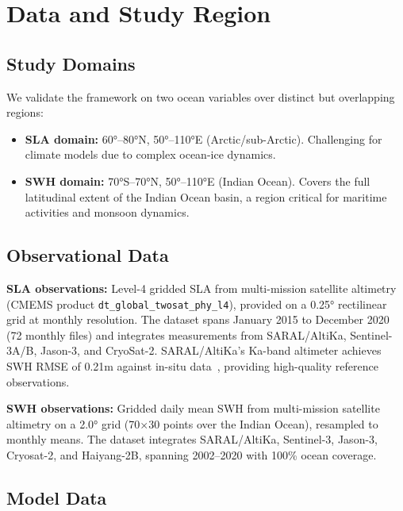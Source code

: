 \documentclass[conference]{IEEEtran}
\begin{document}
\section{Data and Study Region}

\subsection{Study Domains}

We validate the framework on two ocean variables over distinct but overlapping regions:
\begin{itemize}
    \item \textbf{SLA domain:} 60°--80°N, 50°--110°E (Arctic/sub-Arctic). Challenging for climate models due to complex ocean-ice dynamics.
    \item \textbf{SWH domain:} 70°S--70°N, 50°--110°E (Indian Ocean). Covers the full latitudinal extent of the Indian Ocean basin, a region critical for maritime activities and monsoon dynamics.
\end{itemize}

\subsection{Observational Data}

\textbf{SLA observations:} Level-4 gridded SLA from multi-mission satellite altimetry (CMEMS product \texttt{dt\_global\_twosat\_phy\_l4}), provided on a 0.25° rectilinear grid at monthly resolution. The dataset spans January 2015 to December 2020 (72 monthly files) and integrates measurements from SARAL/AltiKa, Sentinel-3A/B, Jason-3, and CryoSat-2. SARAL/AltiKa's Ka-band altimeter achieves SWH RMSE of 0.21m against in-situ data~\cite{saral2015}, providing high-quality reference observations.

\textbf{SWH observations:} Gridded daily mean SWH from multi-mission satellite altimetry on a 2.0° grid (70$\times$30 points over the Indian Ocean), resampled to monthly means. The dataset integrates SARAL/AltiKa, Sentinel-3, Jason-3, Cryosat-2, and Haiyang-2B, spanning 2002--2020 with 100\% ocean coverage.

\subsection{Model Data}
\end{document}
